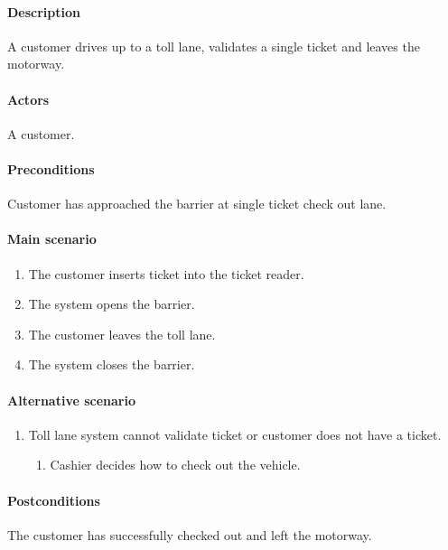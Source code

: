 \paragraph{Description}
A customer drives up to a toll lane, validates a single ticket and leaves the motorway. 
\paragraph{Actors}
A customer.
\paragraph{Preconditions}
Customer has approached the barrier at single ticket check out lane. 
\paragraph{Main scenario}
\begin{enumerate}
\item The customer inserts ticket into the ticket reader.
\item The system opens the  barrier.
\item The customer leaves the toll lane.
\item The system closes the barrier.
\end{enumerate}
\paragraph{Alternative scenario}
\begin{enumerate}
\item Toll lane system cannot validate ticket or customer does not have a ticket.
\begin{enumerate}
\item Cashier decides how to check out the vehicle.
\end{enumerate}
\end{enumerate}
\paragraph{Postconditions}
The customer has successfully checked out and left the motorway.
